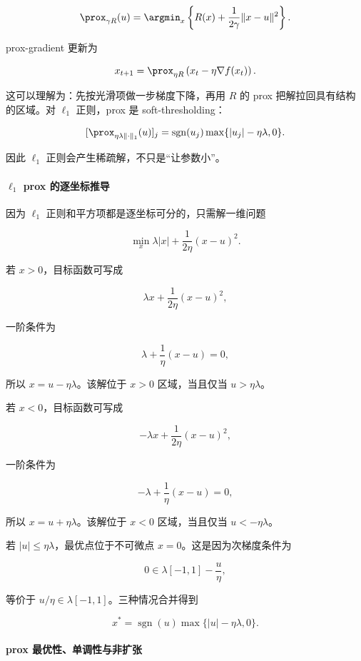 \[
  \prox_{\gamma R}(u)
  =
  \argmin_x
  \left\{
    R(x)+\frac{1}{2\gamma}\|x-u\|^2
  \right\}.
\]

prox-gradient 更新为

\[
  x_{t+1}
  =
  \prox_{\eta R}
  \left(x_t-\eta\nabla f(x_t)\right).
\]

这可以理解为：先按光滑项做一步梯度下降，再用 \(R\) 的 prox 把解拉回具有结构的区域。对 \(\ell_1\) 正则，prox 是 soft-thresholding：

\[
  [\prox_{\eta\lambda\|\cdot\|_1}(u)]_j
  =
  \operatorname{sgn}(u_j)\max\{|u_j|-\eta\lambda,0\}.
\]

因此 \(\ell_1\) 正则会产生稀疏解，不只是“让参数小”。

\paragraph{\(\ell_1\) prox 的逐坐标推导}

因为 \(\ell_1\) 正则和平方项都是逐坐标可分的，只需解一维问题

\[
  \min_x
  \lambda |x|
  +
  \frac{1}{2\eta}(x-u)^2.
\]

若 \(x>0\)，目标函数可写成

\[
  \lambda x+\frac{1}{2\eta}(x-u)^2,
\]

一阶条件为

\[
  \lambda+\frac{1}{\eta}(x-u)=0,
\]

所以 \(x=u-\eta\lambda\)。该解位于 \(x>0\) 区域，当且仅当 \(u>\eta\lambda\)。

若 \(x<0\)，目标函数可写成

\[
  -\lambda x+\frac{1}{2\eta}(x-u)^2,
\]

一阶条件为

\[
  -\lambda+\frac{1}{\eta}(x-u)=0,
\]

所以 \(x=u+\eta\lambda\)。该解位于 \(x<0\) 区域，当且仅当 \(u<-\eta\lambda\)。

若 \(|u|\le\eta\lambda\)，最优点位于不可微点 \(x=0\)。这是因为次梯度条件为

\[
  0\in
  \lambda[-1,1]
  -
  \frac{u}{\eta},
\]

等价于 \(u/\eta\in\lambda[-1,1]\)。三种情况合并得到

\[
  x^*
  =
  \operatorname{sgn}(u)\max\{|u|-\eta\lambda,0\}.
\]

\paragraph{prox 最优性、单调性与非扩张}

